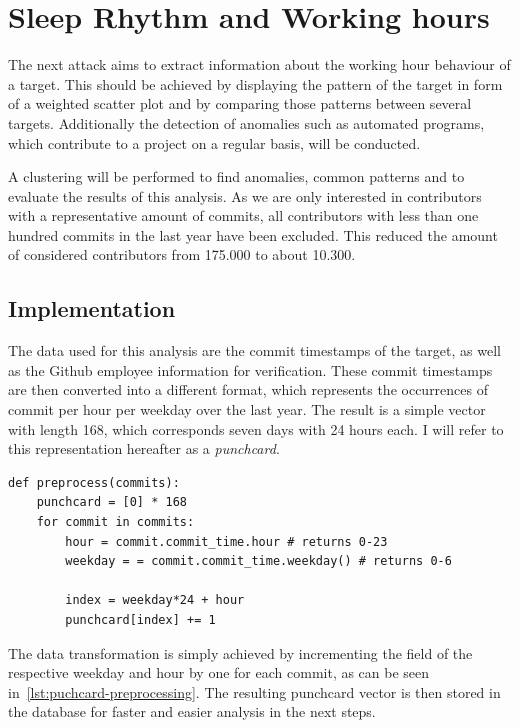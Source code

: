 \section{Sleep Rhythm and Working hours}

The next attack aims to extract information about the working hour behaviour of a target.
This should be achieved by displaying the pattern of the target in form of a weighted scatter plot and by comparing those patterns between several targets.
Additionally the detection of anomalies such as automated programs, which contribute to a project on a regular basis, will be conducted.

A clustering will be performed to find anomalies, common patterns and to evaluate the results of this analysis.
As we are only interested in contributors with a representative amount of commits, all contributors with less than one hundred commits in the last year have been excluded.
This reduced the amount of considered contributors from 175.000 to about 10.300.


\subsection{Implementation}\label{punchcard-implementation}

The data used for this analysis are the commit timestamps of the target, as well as the Github employee information for verification.
These commit timestamps are then converted into a different format, which represents the occurrences of commit per hour per weekday over the last year.
The result is a simple vector with length 168, which corresponds seven days with 24 hours each.
I will refer to this representation hereafter as a \emph{punchcard}.

\begin{verbatim}
def preprocess(commits):
    punchcard = [0] * 168
    for commit in commits:
        hour = commit.commit_time.hour # returns 0-23
        weekday = = commit.commit_time.weekday() # returns 0-6

        index = weekday*24 + hour
        punchcard[index] += 1

\end{verbatim}
\begingroup
{}\label{lst:puchcard-preprocessing}
\endgroup

The data transformation is simply achieved by incrementing the field of the respective weekday and hour by one for each commit, as can be seen in~\ref{lst:puchcard-preprocessing}.
The resulting punchcard vector is then stored in the database for faster and easier analysis in the next steps.


